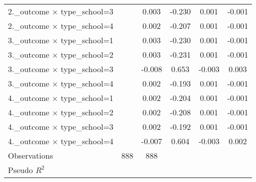 {\begin{tabular}{l*{5}{c}}
2.\_outcome $\times$ type\_school=3&                     &       0.003\sym{**} &      -0.230\sym{***}&       0.001\sym{***}&      -0.001\sym{***}\\
2.\_outcome $\times$ type\_school=4&                     &       0.002\sym{**} &      -0.207\sym{**} &       0.001\sym{***}&      -0.001\sym{***}\\
3.\_outcome $\times$ type\_school=1&                     &       0.003\sym{*}  &      -0.230\sym{***}&       0.001\sym{***}&      -0.001\sym{***}\\
3.\_outcome $\times$ type\_school=2&                     &       0.003\sym{*}  &      -0.231\sym{***}&       0.001\sym{***}&      -0.001\sym{***}\\
3.\_outcome $\times$ type\_school=3&                     &      -0.008\sym{*}  &       0.653\sym{***}&      -0.003\sym{***}&       0.003\sym{***}\\
3.\_outcome $\times$ type\_school=4&                     &       0.002\sym{**} &      -0.193\sym{***}&       0.001\sym{***}&      -0.001\sym{***}\\
4.\_outcome $\times$ type\_school=1&                     &       0.002\sym{**} &      -0.204\sym{***}&       0.001\sym{***}&      -0.001\sym{***}\\
4.\_outcome $\times$ type\_school=2&                     &       0.002\sym{**} &      -0.208\sym{**} &       0.001\sym{***}&      -0.001\sym{***}\\
4.\_outcome $\times$ type\_school=3&                     &       0.002\sym{**} &      -0.192\sym{***}&       0.001\sym{***}&      -0.001\sym{***}\\
4.\_outcome $\times$ type\_school=4&                     &      -0.007\sym{**} &       0.604\sym{***}&      -0.003\sym{***}&       0.002\sym{***}\\
\midrule
Observations        &         888         &         888         &                     &                     &                     \\
Pseudo \(R^{2}\)    &                     &                     &                     &                     &                     \\
\bottomrule
\end{tabular}
}
